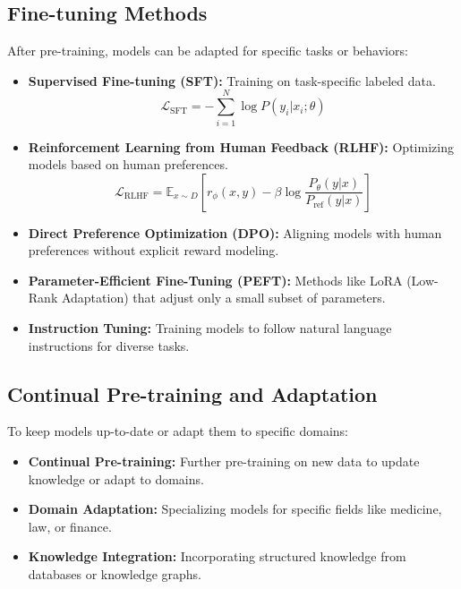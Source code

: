 \documentclass[11pt,a4paper]{report}
\begin{document}
\subsection{Fine-tuning Methods}
After pre-training, models can be adapted for specific tasks or behaviors:

\begin{itemize}
    \item \textbf{Supervised Fine-tuning (SFT):} Training on task-specific labeled data.
    \begin{equation}
    \mathcal{L}_{\text{SFT}} = -\sum_{i=1}^{N} \log P(y_i | x_i; \theta)
    \end{equation}
    
    \item \textbf{Reinforcement Learning from Human Feedback (RLHF):} Optimizing models based on human preferences.
    \begin{equation}
    \mathcal{L}_{\text{RLHF}} = \mathbb{E}_{x \sim D} [r_\phi(x, y) - \beta \log \frac{P_\theta(y|x)}{P_{\text{ref}}(y|x)}]
    \end{equation}
    
    \item \textbf{Direct Preference Optimization (DPO):} Aligning models with human preferences without explicit reward modeling.
    
    \item \textbf{Parameter-Efficient Fine-Tuning (PEFT):} Methods like LoRA (Low-Rank Adaptation) that adjust only a small subset of parameters.
    
    \item \textbf{Instruction Tuning:} Training models to follow natural language instructions for diverse tasks.
\end{itemize}

\subsection{Continual Pre-training and Adaptation}
To keep models up-to-date or adapt them to specific domains:

\begin{itemize}
    \item \textbf{Continual Pre-training:} Further pre-training on new data to update knowledge or adapt to domains.
    
    \item \textbf{Domain Adaptation:} Specializing models for specific fields like medicine, law, or finance.
    
    \item \textbf{Knowledge Integration:} Incorporating structured knowledge from databases or knowledge graphs.
\end{itemize}
\end{document}
